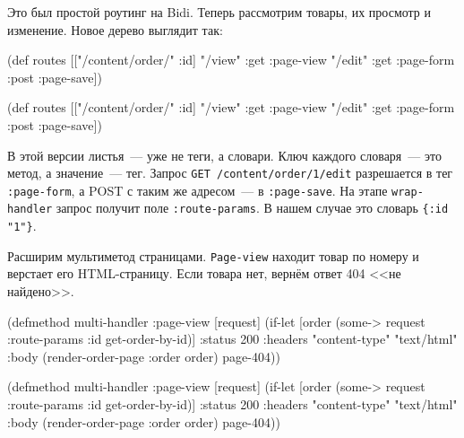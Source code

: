 Это был простой роутинг на Bidi. Теперь рассмотрим товары, их
просмотр и изменение. Новое дерево выглядит так:

\ifx\DEVICETYPE\MOBILE

\begin{english}
  \begin{clojure}
(def routes
  [["/content/order/" :id]
   {"/view" {:get  :page-view}
    "/edit" {:get  :page-form
             :post :page-save}}])
  \end{clojure}
\end{english}

\else

\begin{english}
  \begin{clojure}
(def routes
  [["/content/order/" :id] {"/view" {:get  :page-view}
                            "/edit" {:get  :page-form
                                     :post :page-save}}])
  \end{clojure}
\end{english}

\fi

\mnoindent
В этой версии листья~--- уже не теги, а словари. Ключ каждого словаря~--- это метод, а
значение~--- тег. Запрос \verb|GET /content/order/1/edit| разрешается в тег
\verb|:page-form|, а POST с таким же адресом~--- в \verb|:page-save|.  На
этапе \verb|wrap-handler| запрос получит поле \texttt{:route-par\-ams}. В нашем
случае это словарь \verb|{:id "1"}|.


\mnoindent
Расширим мультиметод страницами. \verb|Page-view| находит товар по номеру и
верстает его HTML-страницу. Если товара нет, вернём ответ 404 <<не
найдено>>.

\ifx\DEVICETYPE\MOBILE

\begin{english}
  \begin{clojure}
(defmethod multi-handler :page-view
  [request]
  (if-let [order (some->
                   request
                   :route-params
                   :id
                   get-order-by-id)]
    {:status 200
     :headers {"content-type"
               "text/html"}
     :body (render-order-page
             {:order order})}
    page-404))
  \end{clojure}
\end{english}

\else

\begin{english}
  \begin{clojure}
(defmethod multi-handler :page-view
  [request]
  (if-let [order (some-> request
                         :route-params
                         :id
                         get-order-by-id)]
    {:status 200
     :headers {"content-type" "text/html"}
     :body (render-order-page {:order order})}
    page-404))
  \end{clojure}
\end{english}

